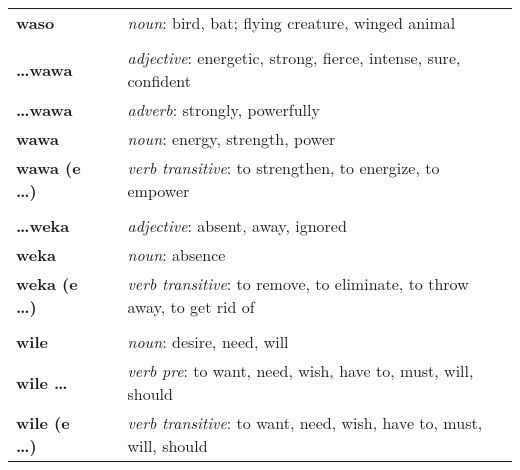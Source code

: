 \begin{supertabular}{p{2,5cm}|ll}
\textbf{waso} && \textit{noun}: bird, bat; flying creature, winged animal \\ 
 && \\ %
\textbf{\dots wawa} && \textit{adjective}: energetic, strong, fierce, intense, sure, confident \\ 
\textbf{\dots wawa} && \textit{adverb}: strongly, powerfully \\ 
\textbf{wawa} && \textit{noun}: energy, strength, power \\ 
\textbf{wawa (e \dots)} && \textit{verb transitive}: to strengthen, to energize, to empower \\ 
 && \\ %
\textbf{\dots weka} && \textit{adjective}: absent, away, ignored \\ 
\textbf{weka} && \textit{noun}: absence \\ 
\textbf{weka (e \dots)} && \textit{verb transitive}: to remove, to eliminate, to throw away, to get rid of \\ 
 && \\ %
\textbf{wile} && \textit{noun}: desire, need, will \\ 
\textbf{wile \dots} && \textit{verb pre}: to want, need, wish, have to, must, will, should \\ 
\textbf{wile (e \dots)} && \textit{verb transitive}: to want, need, wish, have to, must, will, should \\ 
\end{supertabular} \\

%
